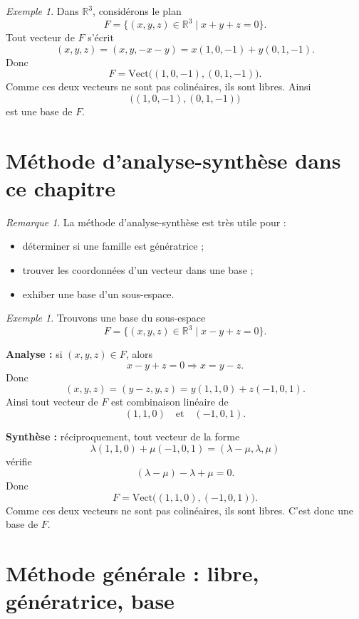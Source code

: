 \documentclass[11pt,a4paper]{article}
\theoremstyle{remark}
\newtheorem{remarque}[definition]{Remarque}
\newtheorem{exemple}[definition]{Exemple}
\newcommand{\R}{\mathbb{R}}
\newcommand{\Vect}{\mathrm{Vect}}
\begin{document}
\begin{exemple}
Dans \(\R^3\), considérons le plan
\[
F=\{(x,y,z)\in\R^3\mid x+y+z=0\}.
\]
Tout vecteur de \(F\) s’écrit
\[
(x,y,z)=(x,y,-x-y)=x(1,0,-1)+y(0,1,-1).
\]
Donc
\[
F=\Vect\big((1,0,-1),(0,1,-1)\big).
\]
Comme ces deux vecteurs ne sont pas colinéaires, ils sont libres. Ainsi
\[
\big((1,0,-1),(0,1,-1)\big)
\]
est une base de \(F\).
\end{exemple}

\section{Méthode d’analyse-synthèse dans ce chapitre}

\begin{remarque}
La méthode d’analyse-synthèse est très utile pour :
\begin{itemize}
    \item déterminer si une famille est génératrice ;
    \item trouver les coordonnées d’un vecteur dans une base ;
    \item exhiber une base d’un sous-espace.
\end{itemize}
\end{remarque}

\begin{exemple}
Trouvons une base du sous-espace
\[
F=\{(x,y,z)\in\R^3\mid x-y+z=0\}.
\]

\textbf{Analyse :} si \((x,y,z)\in F\), alors
\[
x-y+z=0 \Longrightarrow x=y-z.
\]
Donc
\[
(x,y,z)=(y-z,y,z)=y(1,1,0)+z(-1,0,1).
\]
Ainsi tout vecteur de \(F\) est combinaison linéaire de
\[
(1,1,0)\quad \text{et} \quad (-1,0,1).
\]

\textbf{Synthèse :} réciproquement, tout vecteur de la forme
\[
\lambda(1,1,0)+\mu(-1,0,1)=(\lambda-\mu,\lambda,\mu)
\]
vérifie
\[
(\lambda-\mu)-\lambda+\mu=0.
\]
Donc
\[
F=\Vect\big((1,1,0),(-1,0,1)\big).
\]
Comme ces deux vecteurs ne sont pas colinéaires, ils sont libres. C’est donc une base de \(F\).
\end{exemple}

\section{Méthode générale : libre, génératrice, base}
\end{document}
